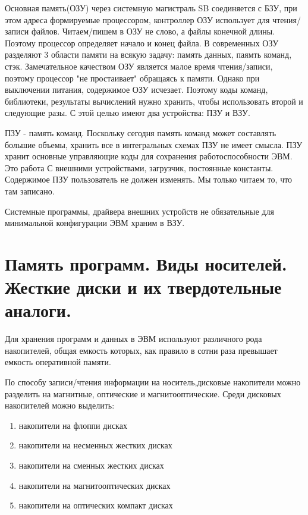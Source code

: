 \documentclass[unicode, 12pt, a4paper, oneside]{article}
\begin{document}
Основная память(ОЗУ) через системную магистраль SB соединяется с БЗУ, при этом адреса формируемые процессором, контроллер ОЗУ использует для чтения/записи файлов. Читаем/пишем в ОЗУ не слово, а файлы конечной длины. Поэтому процессор определяет начало и конец файла. В современных ОЗУ разделяют 3 области памяти на всякую задачу: память данных, паямть команд, стэк. Замечательное качеством ОЗУ является малое время чтения/записи, поэтому процессор "не простаивает" обращаясь к памяти. Однако при выключении питания, содержимое ОЗУ исчезает. Поэтому коды команд, библиотеки, результаты вычислений нужно хранить, чтобы использовать второй и следующие разы. С этой целью имеют два устройства: ПЗУ и ВЗУ.

ПЗУ - память команд. Поскольку сегодня память команд может составлять большие объемы, хранить все в интегральных схемах ПЗУ не имеет смысла. ПЗУ хранит основные управляющие коды для сохранения работоспособности ЭВМ. Это работа С внешними устройствами, загрузчик, постоянные константы. Содержимое ПЗУ пользователь не должен изменять. Мы только читаем то, что там записано.

Системные программы, драйвера внешних устройств не обязательные для минимальной конфигурации ЭВМ храним в ВЗУ.
 
\section{Память программ. Виды носителей. Жесткие диски и их твердотельные аналоги.}

Для хранения программ и данных в ЭВМ используют различного рода накопителей, общая емкость которых, как правило в сотни раза превышает емкость оперативной памяти.

По способу записи/чтения информации на носитель,дисковые накопители можно разделить на магнитные, оптические и магнитооптические. Среди дисковых накопителей можно выделить:
\begin{enumerate}
\item накопители на флоппи дисках
\item накопители на несменных жестких дисках
\item накопители на сменных жестких дисках
\item накопители на магнитооптических дисках
\item накопители на оптических компакт дисках
\end{enumerate}
\end{document}
